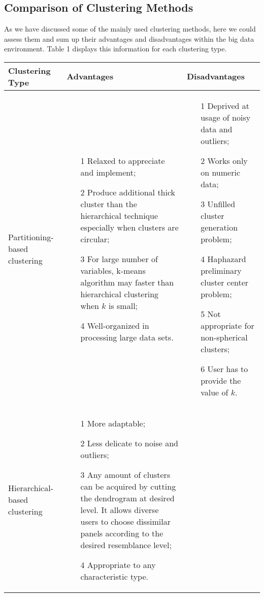 \documentclass[sigconf]{acmart}
\begin{document}
\subsection{Comparison of Clustering Methods}

As we have discussed some of the mainly used clustering methods, here we could assess them and sum up their advantages and disadvantages within the big data environment. Table 1 displays this information for each clustering type.
\begin{table*}[htb]
\centering
\begin{tabular}{|p{}|p{}|p{}|} \hline
\textsf{Clustering Type } & \textsf{Advantages} & \textsf{Disadvantages} \\ \hline
Partitioning-based clustering & \begin{itemize}
\item[1] Relaxed to appreciate and implement;
\item[2] Produce additional thick cluster than the hierarchical technique especially when clusters are circular;
\item[3] For large number of variables, k-means algorithm may faster than hierarchical clustering when $k$ is small;
\item[4] Well-organized in processing large data sets.
\end{itemize} & \begin{itemize}
\item[1] Deprived at usage of noisy data and outliers;
\item[2] Works only on numeric data;
\item[3] Unfilled cluster generation problem;
\item[4] Haphazard preliminary cluster center problem;
\item[5] Not appropriate for non-spherical clusters;
\item[6] User has to provide the value of $k$.
\end{itemize} \\ \hline
Hierarchical-based clustering & \begin{itemize}
\item[1] More adaptable;
\item[2] Less delicate to noise and outliers;
\item[3] Any amount of clusters can be acquired by cutting the dendrogram at desired level. It allows diverse users to choose dissimilar panels according to the desired resemblance level;
\item[4] Appropriate to any characteristic type.

\end{itemize}
\end{tabular}
\end{table*}
\end{document}
